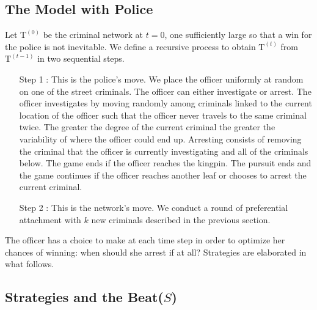 \documentclass[%
 reprint,
 amsmath,amssymb,
 aps,
]{revtex4-1}
\renewcommand{\t }[1]{\mathrm{#1}}
\theoremstyle{plain}
\theoremstyle{definition}
\begin{document}
\subsection*{The Model with Police}
Let $\t T^{(0)}$ be the criminal network at $t =0$, one sufficiently large so that a win for the police is not inevitable.  We define a recursive process to obtain $\t T^{(t)}$ from $\t T^{(t-1)}$ in two sequential steps.
\begin{changemargin}{7mm}{0mm}
\begin{enumerate}
[label=(\arabic*)]
 \item[Step 1 :]  This is the police's move.  We place the officer uniformly at random on one of the street criminals.  The officer can either investigate or arrest.  The officer investigates by moving randomly among criminals linked to the current location of the officer such that the officer never travels to the same criminal twice.  The greater the degree of the current criminal the greater the variability of where the officer could end up.  Arresting consists of removing the criminal that the officer is currently investigating and all of the criminals below.  The game ends if the officer reaches the kingpin.  The pursuit ends and the game continues if the officer reaches another leaf or chooses to arrest the current criminal.
\item[ Step 2 :] This is the network's move.  We conduct a round of preferential attachment with $k$ new criminals described in the previous section.
\end{enumerate}
\end{changemargin}
The officer has a choice to make at each time step in order to optimize her chances of winning: when should she arrest if at all?  Strategies are elaborated in what follows. 

\subsection*{Strategies and the Beat($S$)}
\end{document}
